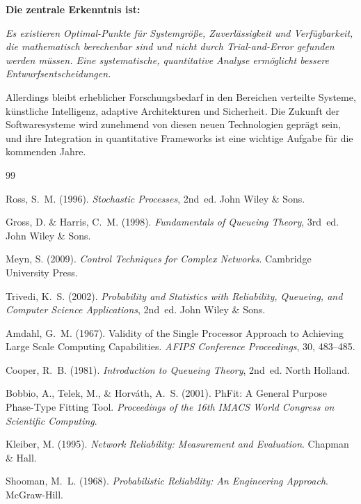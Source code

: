 \documentclass[a4paper,11pt]{article}
\theoremstyle{definition}
\begin{document}
\textbf{Die zentrale Erkenntnis ist:}

\emph{Es existieren Optimal-Punkte für Systemgröße, Zuverlässigkeit und Verfügbarkeit, 
die mathematisch berechenbar sind und nicht durch Trial-and-Error gefunden werden müssen. 
Eine systematische, quantitative Analyse ermöglicht bessere Entwurfsentscheidungen.}

Allerdings bleibt erheblicher Forschungsbedarf in den Bereichen verteilte Systeme, 
künstliche Intelligenz, adaptive Architekturen und Sicherheit. Die Zukunft der 
Softwaresysteme wird zunehmend von diesen neuen Technologien geprägt sein, und ihre 
Integration in quantitative Frameworks ist eine wichtige Aufgabe für die kommenden Jahre.

\begin{thebibliography}{99}

    Ross, S.~M. (1996).
    \textit{Stochastic Processes}, 2nd~ed.
    John Wiley \& Sons.

    Gross, D. \& Harris, C.~M. (1998).
    \textit{Fundamentals of Queueing Theory}, 3rd~ed.
    John Wiley \& Sons.

    Meyn, S. (2009).
    \textit{Control Techniques for Complex Networks}.
    Cambridge University Press.

    Trivedi, K.~S. (2002).
    \textit{Probability and Statistics with Reliability, Queueing,
    and Computer Science Applications}, 2nd~ed.
    John Wiley \& Sons.

    Amdahl, G.~M. (1967).
    Validity of the Single Processor Approach to Achieving Large Scale Computing Capabilities.
    \textit{AFIPS Conference Proceedings}, 30, 483--485.

    Cooper, R.~B. (1981).
    \textit{Introduction to Queueing Theory}, 2nd~ed.
    North Holland.

    Bobbio, A., Telek, M., \& Horváth, A.~S. (2001).
    PhFit: A General Purpose Phase-Type Fitting Tool.
    \textit{Proceedings of the 16th IMACS World Congress on Scientific Computing}.

    Kleiber, M. (1995).
    \textit{Network Reliability: Measurement and Evaluation}.
    Chapman \& Hall.

    Shooman, M.~L. (1968).
    \textit{Probabilistic Reliability: An Engineering Approach}.
    McGraw-Hill.


\end{thebibliography}
\end{document}

